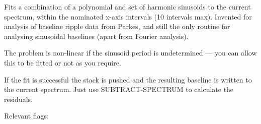 \documentclass[11pt,twoside]{report}
\begin{document}
Fits a combination of a polynomial and set of harmonic sinusoids to the
current spectrum, within the nominated x-axis intervals (10 intervals max).
Invented for analysis of baseline ripple data from Parkes, and still the
only routine for analysing sinusoidal baselines (apart from Fourier analysis).

The problem is non-linear if the sinusoid period is undetermined --- you can
allow this to be fitted or not as you require.

If the fit is successful the stack is pushed and the resulting baseline is
written to the current spectrum. Just use SUBTRACT-SPECTRUM to calculate the
residuals.

Relevant flags:\\
\end{document}
